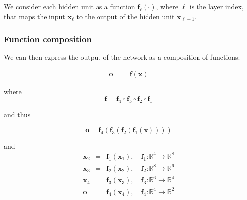 \documentclass[smaller]{beamer}
\begin{document}
\begin{frame}
\begin{center}
  \end{center}

  \pause
  We consider each hidden unit as a function $\bm f_{\ell}(\cdot)$, where $\ell$ is the layer index, that maps the input $\bm x_{\ell}$ to the output of the hidden unit $\bm x_{\ell+1}$. \pause

\end{frame}


\begin{frame}
  \frametitle{Function composition}

  We can then express the output of the network as a composition of functions:

  \begin{eqnarray}
    \bm o &=& \bm f(\bm x)
  \end{eqnarray}

  \pause
  where 
  \begin{equation}
    \bm f = \bm f_{4} \circ \bm f_{3} \circ \bm f_{2} \circ \bm f_{1}
  \end{equation}

  and thus

  \begin{equation}
    \bm o = \bm f_{4}(\bm f_{3}(\bm f_{2}(\bm f_{1}(\bm x))))
  \end{equation}

  and
  \begin{eqnarray*}
    \bm x_{2} &=& \bm f_{1}(\bm x_1), \quad \bm f_1 : \mathbb{R}^4 \to \mathbb{R}^8 \\
    \bm x_{3} &=& \bm f_{2}(\bm x_{2}), \quad \bm f_2 : \mathbb{R}^8 \to \mathbb{R}^6 \\
    \bm x_4 &=& \bm f_{3}(\bm x_{3}), \quad \bm f_3 : \mathbb{R}^6 \to \mathbb{R}^4 \\
    \bm o &=& \bm f_{4}(\bm x_{4}), \quad \bm f_4 : \mathbb{R}^4 \to \mathbb{R}^2
  \end{eqnarray*}
\end{frame}
\end{document}
